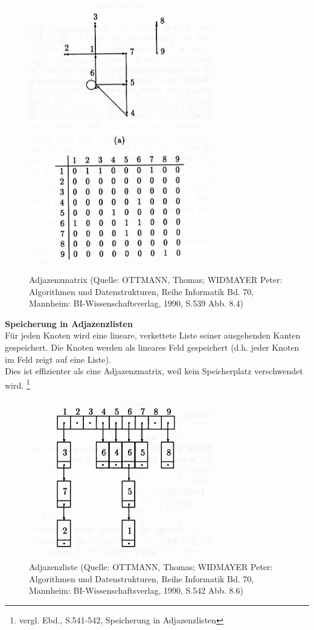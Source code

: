 \begin{figure}[h]
\centering
\includegraphics[width = 8cm, bb=0 0 300 400]{./chapters/adjazenzmatrix.jpg}
\caption{Adjazenzmatrix {\tiny (Quelle: OTTMANN, Thomas; WIDMAYER Peter: Algorithmen und Datenstrukturen, Reihe Informatik Bd. 70, Mannheim: BI-Wissenschaftsverlag, 1990, S.539 Abb. 8.4)} }
\label{a2}
\end{figure}
 
\textbf{Speicherung in Adjazenzlisten}\\
Für jeden Knoten wird eine lineare, verkettete Liste seiner ausgehenden Kanten gespeichert.
Die Knoten werden als lineares Feld gespeichert (d.h. jeder Knoten im Feld zeigt auf eine Liste). \\
Dies ist effizienter als eine Adjazenzmatrix, weil kein Speicherplatz verschwendet wird.
 \footnote{vergl. Ebd., S.541-542, Speicherung in Adjazenzlisten} \\

\begin{figure}[h]
\centering
\includegraphics[width = 8cm, bb=0 0 300 400]{./chapters/adjazenzliste.jpg}
\caption{Adjazenzliste {\tiny (Quelle: OTTMANN, Thomas; WIDMAYER Peter: Algorithmen und Datenstrukturen, Reihe Informatik Bd. 70, Mannheim: BI-Wissenschaftsverlag, 1990, S.542 Abb. 8.6)} }
\label{a3}
\end{figure} 

